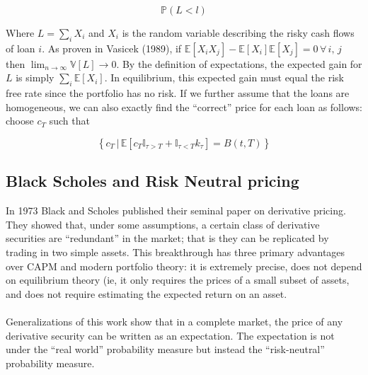 \documentclass{article}
\theoremstyle{definition}
\begin{document}
\begin{equation}
\mathbb{P}(L<l)
\end{equation}

Where \(L=\sum_i X_i \) and \(X_i\) is the random variable describing the risky cash flows of loan \(i\).  As proven in Vasicek (1989), if \(\mathbb{E}[X_iX_j]-\mathbb{E}[X_i]\mathbb{E}[X_j]=0\,\forall\,i,\,j\) then \( \lim_{n \to \infty}\mathbb{V}[L] \to 0\).  By the definition of expectations, the expected gain for \(L\) is simply \(\sum_i \mathbb{E}[X_i]\).  In equilibrium, this expected gain must equal the risk free rate since the portfolio has no risk.  If we further assume that the loans are homogeneous, we can also exactly find the ``correct'' price for each loan as follows: choose \(c_T\) such that

\[
\left\{c_T \,|\, \mathbb{E}\left[ c_T \mathbb{I}_{\tau>T}+\mathbb{I}_{\tau<T} k_\tau \right]=B(t, T)\right\}
\]

\subsection{Black Scholes and Risk Neutral pricing}

In 1973 Black and Scholes published their seminal paper on derivative pricing.  They showed that, under some assumptions, a certain class of derivative securities are ``redundant'' in the market; that is they can be replicated by trading in two simple assets.  This breakthrough has three primary advantages over CAPM and modern portfolio theory: it is extremely precise, does not depend on equilibrium theory (ie, it only requires the prices of a small subset of assets, and does not require estimating the expected return on an asset.  
\\
\\
Generalizations of this work show that in a complete market, the price of any derivative security can be written as an expectation.  The expectation is not under the ``real world'' probability measure but instead the ``risk-neutral'' probability measure.  
\end{document}

